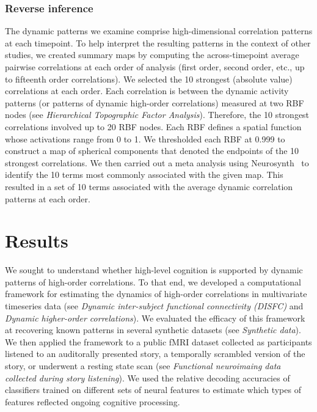 \documentclass[english]{article}
\begin{document}
\subsubsection*{Reverse inference}
The dynamic patterns we examine comprise high-dimensional correlation
patterns at each timepoint.  To help interpret the resulting patterns
in the context of other studies, we created summary maps by computing
the across-timepoint average pairwise correlations at each order of
analysis (first order, second order, etc., up to fifteenth order
correlations).  We selected the 10 strongest (absolute value)
correlations at each order.  Each correlation is between the dynamic
activity patterns (or patterns of dynamic high-order correlations)
measured at two RBF nodes (see \textit{Hierarchical Topographic Factor
  Analysis}).  Therefore, the 10 strongest correlations involved up to
20 RBF nodes.  Each RBF defines a spatial function whose activations
range from 0 to 1.  We thresholded each RBF at 0.999 to construct a
map of spherical components that denoted the endpoints of the 10
strongest correlations.  We then carried out a meta analysis using
Neurosynth~\citep{RubiEtal17} to identify the 10 terms most commonly
associated with the given map.  This resulted in a set of 10 terms
associated with the average dynamic correlation patterns at each order.



\section*{Results}
We sought to understand whether high-level cognition is supported by
dynamic patterns of high-order correlations.  To that end, we
developed a computational framework for estimating the dynamics of
high-order correlations in multivariate timeseries data (see
\textit{Dynamic inter-subject functional connectivity (DISFC)} and
\textit{Dynamic higher-order correlations}).  We evaluated the
efficacy of this framework at recovering known patterns in several
synthetic datasets (see \textit{Synthetic data}).  We then applied the
framework to a public fMRI dataset collected as participants listened
to an auditorally presented story, a temporally scrambled version of
the story, or underwent a resting state scan (see \textit{Functional
  neuroimaing data collected during story listening}).  We used the
relative decoding accuracies of classifiers trained on
different sets of neural features to estimate which types of features
reflected ongoing cognitive processing.
\end{document}
